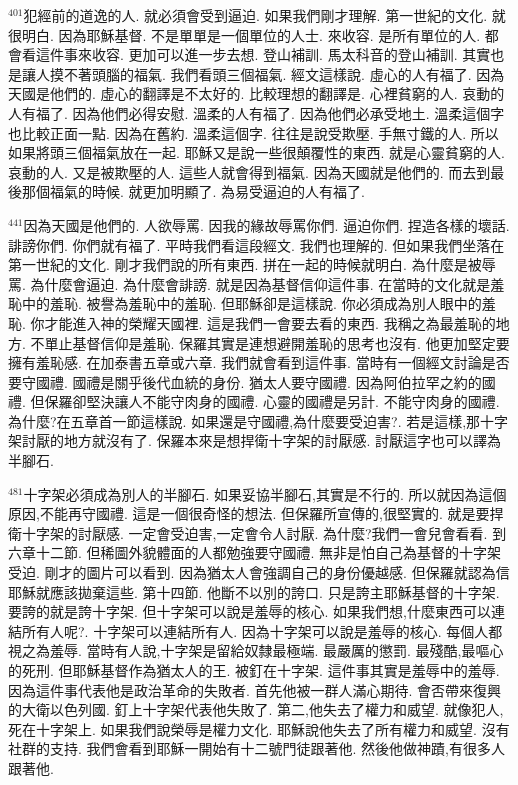 \documentclass{book}
\begin{document}
$^{401}$犯經前的道逸的人.
就必須會受到逼迫.
如果我們剛才理解.
第一世紀的文化.
就很明白.
因為耶穌基督.
不是單單是一個單位的人士.
來收容.
是所有單位的人.
都會看這件事來收容.
更加可以進一步去想.
登山補訓.
馬太科音的登山補訓.
其實也是讓人摸不著頭腦的福氣.
我們看頭三個福氣.
經文這樣說.
虛心的人有福了.
因為天國是他們的.
虛心的翻譯是不太好的.
比較理想的翻譯是.
心裡貧窮的人.
哀動的人有福了.
因為他們必得安慰.
溫柔的人有福了.
因為他們必承受地土.
溫柔這個字也比較正面一點.
因為在舊約.
溫柔這個字.
往往是說受欺壓.
手無寸鐵的人.
所以如果將頭三個福氣放在一起.
耶穌又是說一些很顛覆性的東西.
就是心靈貧窮的人.
哀動的人.
又是被欺壓的人.
這些人就會得到福氣.
因為天國就是他們的.
而去到最後那個福氣的時候.
就更加明顯了.
為易受逼迫的人有福了.

$^{441}$因為天國是他們的.
人欲辱罵.
因我的緣故辱罵你們.
逼迫你們.
捏造各樣的壞話.
誹謗你們.
你們就有福了.
平時我們看這段經文.
我們也理解的.
但如果我們坐落在第一世紀的文化.
剛才我們說的所有東西.
拼在一起的時候就明白.
為什麼是被辱罵.
為什麼會逼迫.
為什麼會誹謗.
就是因為基督信仰這件事.
在當時的文化就是羞恥中的羞恥.
被譽為羞恥中的羞恥.
但耶穌卻是這樣說.
你必須成為別人眼中的羞恥.
你才能進入神的榮耀天國裡.
這是我們一會要去看的東西.
我稱之為最羞恥的地方.
不單止基督信仰是羞恥.
保羅其實是連想避開羞恥的思考也沒有.
他更加堅定要擁有羞恥感.
在加泰書五章或六章.
我們就會看到這件事.
當時有一個經文討論是否要守國禮.
國禮是關乎後代血統的身份.
猶太人要守國禮.
因為阿伯拉罕之約的國禮.
但保羅卻堅決讓人不能守肉身的國禮.
心靈的國禮是另計.
不能守肉身的國禮.
為什麼?在五章首一節這樣說.
如果還是守國禮,為什麼要受迫害?.
若是這樣,那十字架討厭的地方就沒有了.
保羅本來是想捍衛十字架的討厭感.
討厭這字也可以譯為半腳石.

$^{481}$十字架必須成為別人的半腳石.
如果妥協半腳石,其實是不行的.
所以就因為這個原因,不能再守國禮.
這是一個很奇怪的想法.
但保羅所宣傳的,很堅實的.
就是要捍衛十字架的討厭感.
一定會受迫害,一定會令人討厭.
為什麼?我們一會兒會看看.
到六章十二節.
但稀圖外貌體面的人都勉強要守國禮.
無非是怕自己為基督的十字架受迫.
剛才的圖片可以看到.
因為猶太人會強調自己的身份優越感.
但保羅就認為信耶穌就應該拋棄這些.
第十四節.
他斷不以別的誇口.
只是誇主耶穌基督的十字架.
要誇的就是誇十字架.
但十字架可以說是羞辱的核心.
如果我們想,什麼東西可以連結所有人呢?.
十字架可以連結所有人.
因為十字架可以說是羞辱的核心.
每個人都視之為羞辱.
當時有人說,十字架是留給奴隸最極端.
最嚴厲的懲罰.
最殘酷,最嘔心的死刑.
但耶穌基督作為猶太人的王.
被釘在十字架.
這件事其實是羞辱中的羞辱.
因為這件事代表他是政治革命的失敗者.
首先他被一群人滿心期待.
會否帶來復興的大衛以色列國.
釘上十字架代表他失敗了.
第二,他失去了權力和威望.
就像犯人,死在十字架上.
如果我們說榮辱是權力文化.
耶穌說他失去了所有權力和威望.
沒有社群的支持.
我們會看到耶穌一開始有十二號門徒跟著他.
然後他做神蹟,有很多人跟著他.
\end{document}

